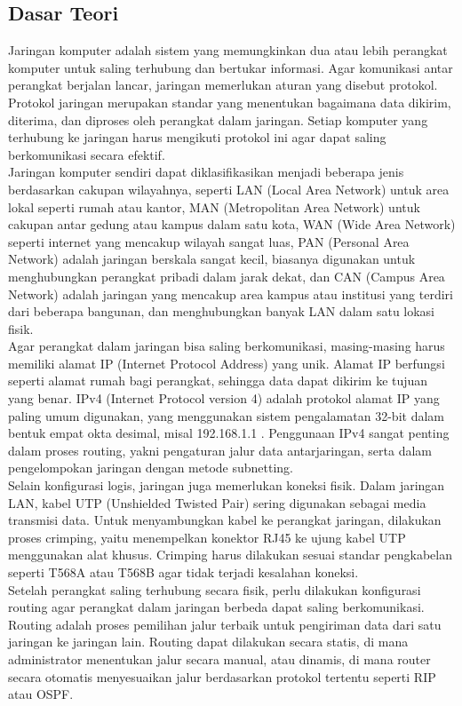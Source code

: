 \subsection{Dasar Teori}
Jaringan komputer adalah sistem yang memungkinkan dua atau lebih perangkat komputer untuk saling terhubung dan bertukar informasi. Agar komunikasi antar perangkat berjalan lancar, jaringan memerlukan aturan yang disebut protokol. Protokol jaringan merupakan standar yang menentukan bagaimana data dikirim, diterima, dan diproses oleh perangkat dalam jaringan. Setiap komputer yang terhubung ke jaringan harus mengikuti protokol ini agar dapat saling berkomunikasi secara efektif. \\ Jaringan komputer sendiri dapat diklasifikasikan menjadi beberapa jenis berdasarkan cakupan wilayahnya, seperti LAN (Local Area Network) untuk area lokal seperti rumah atau kantor, MAN (Metropolitan Area Network) untuk cakupan antar gedung atau kampus dalam satu kota, WAN (Wide Area Network) seperti internet yang mencakup wilayah sangat luas, PAN (Personal Area Network) adalah jaringan berskala sangat kecil, biasanya digunakan untuk menghubungkan perangkat pribadi dalam jarak dekat, dan CAN (Campus Area Network) adalah jaringan yang mencakup area kampus atau institusi yang terdiri dari beberapa bangunan, dan menghubungkan banyak LAN dalam satu lokasi fisik. \\ Agar perangkat dalam jaringan bisa saling berkomunikasi, masing-masing harus memiliki alamat IP (Internet Protocol Address) yang unik. Alamat IP berfungsi seperti alamat rumah bagi perangkat, sehingga data dapat dikirim ke tujuan yang benar. IPv4 (Internet Protocol version 4) adalah protokol alamat IP yang paling umum digunakan, yang menggunakan sistem pengalamatan 32-bit dalam bentuk empat okta desimal, misal 192.168.1.1 . Penggunaan IPv4 sangat penting dalam proses routing, yakni pengaturan jalur data antarjaringan, serta dalam pengelompokan jaringan dengan metode subnetting. \\ Selain konfigurasi logis, jaringan juga memerlukan koneksi fisik. Dalam jaringan LAN, kabel UTP (Unshielded Twisted Pair) sering digunakan sebagai media transmisi data. Untuk menyambungkan kabel ke perangkat jaringan, dilakukan proses crimping, yaitu menempelkan konektor RJ45 ke ujung kabel UTP menggunakan alat khusus. Crimping harus dilakukan sesuai standar pengkabelan seperti T568A atau T568B agar tidak terjadi kesalahan koneksi. \\ Setelah perangkat saling terhubung secara fisik, perlu dilakukan konfigurasi routing agar perangkat dalam jaringan berbeda dapat saling berkomunikasi. Routing adalah proses pemilihan jalur terbaik untuk pengiriman data dari satu jaringan ke jaringan lain. Routing dapat dilakukan secara statis, di mana administrator menentukan jalur secara manual, atau dinamis, di mana router secara otomatis menyesuaikan jalur berdasarkan protokol tertentu seperti RIP atau OSPF.

